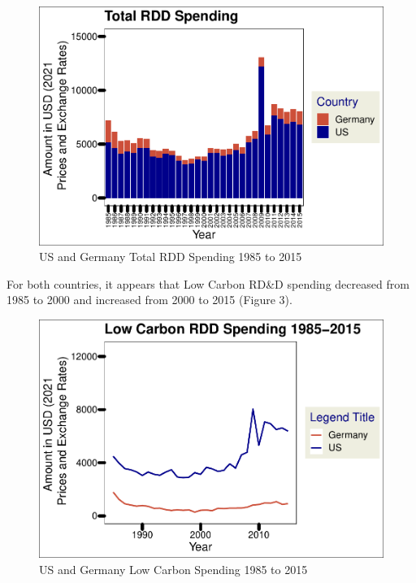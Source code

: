 \documentclass[
  12pt,
]{article}
\begin{document}
\begin{figure}
\centering
\includegraphics{Chang_Jenkins_Mullens_ENV872_Final_files/figure-latex/Germany and US Bar Plot for total budget-1.pdf}
\caption{US and Germany Total RDD Spending 1985 to 2015}
\end{figure}

\newpage

For both countries, it appears that Low Carbon RD\&D spending decreased
from 1985 to 2000 and increased from 2000 to 2015 (Figure 3).

\begin{figure}
\centering
\includegraphics{Chang_Jenkins_Mullens_ENV872_Final_files/figure-latex/Low Carbon Germ and US Line Plot-1.pdf}
\caption{US and Germany Low Carbon Spending 1985 to 2015}
\end{figure}
\end{document}
